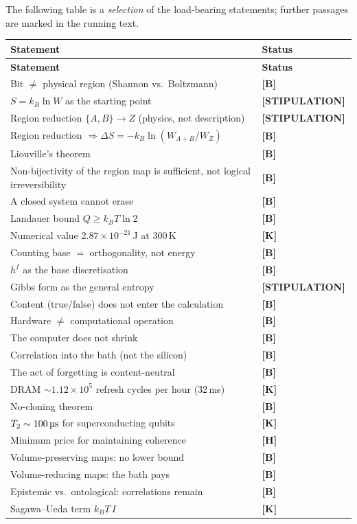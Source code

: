 \documentclass[11pt,a4paper]{article}
\newcommand{\LS}{\textcolor{laySet}{\textbf{\footnotesize\textsf{[STIPULATION]}}}\,}
\newcommand{\LK}{\textcolor{layK}{\textbf{\footnotesize\textsf{[K]}}}\,}
\newcommand{\LB}{\textcolor{layB}{\textbf{\footnotesize\textsf{[B]}}}\,}
\newcommand{\LH}{\textcolor{layH}{\textbf{\footnotesize\textsf{[H]}}}\,}
\begin{document}
The following table is a \emph{selection} of the load-bearing statements; further
passages are marked in the running text.

\begin{center}
\small
\begin{longtable}{@{}p{}l@{}}
\toprule
\textbf{Statement} & \textbf{Status} \\
\midrule
\endfirsthead
\toprule
\textbf{Statement} & \textbf{Status} \\
\midrule
\endhead
Bit $\ne$ physical region (Shannon vs.\ Boltzmann) & \LB \\
$S = k_B \ln W$ as the starting point & \LS \\
Region reduction $\{A,B\}\to Z$ (physics, not description) & \LS \\
Region reduction $\Rightarrow \Delta S = -k_B \ln(W_{A+B}/W_Z)$ & \LB \\
Liouville's theorem & \LB \\
Non-bijectivity of the region map is sufficient, not logical irreversibility & \LB \\
A closed system cannot erase & \LB \\
Landauer bound $Q \ge k_B T \ln 2$ & \LB \\
Numerical value $2.87\times10^{-21}$\,J at 300\,K & \LK \\
Counting base $=$ orthogonality, not energy & \LB \\
$h^f$ as the base discretisation & \LB \\
Gibbs form as the general entropy & \LS \\
Content (true/false) does not enter the calculation & \LB \\
Hardware $\ne$ computational operation & \LB \\
The computer does not shrink & \LB \\
Correlation into the bath (not the silicon) & \LB \\
The act of forgetting is content-neutral & \LB \\
DRAM ${\sim}1.12\times10^{5}$ refresh cycles per hour (32\,ms) & \LK \\
No-cloning theorem & \LB \\
$T_2 \sim 100\,\text{\textmu s}$ for superconducting qubits & \LK \\
Minimum price for maintaining coherence & \LH \\
Volume-preserving maps: no lower bound & \LB \\
Volume-reducing maps: the bath pays & \LB \\
Epistemic vs.\ ontological: correlations remain & \LB \\
Sagawa--Ueda term $k_B T\,I$ & \LK \\
\bottomrule
\end{longtable}
\end{center}
\end{document}
